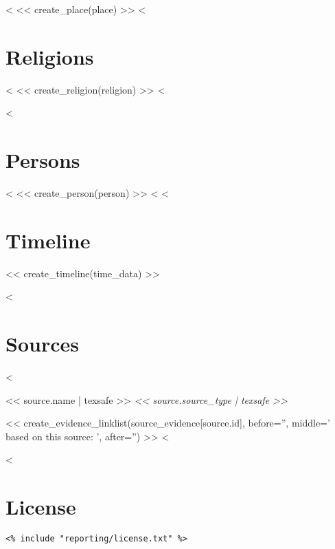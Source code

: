 \documentclass[fontsize=10pt,toc=chapterentrywithdots]{scrreprt}
\begin{document}
<%
<< create_place(place) >>
<%


\clearpage
\chapter{Religions}
\label{sec:religions}

<%
  << create_religion(religion) >>
<%


<%
\clearpage
\chapter{Persons}
\label{sec:persons}

<%
  << create_person(person) >>
<%
<%


\clearpage
\chapter{Timeline}
\label{sec:timeline}

<< create_timeline(time_data) >>


<%
\clearpage
\chapter{Sources}
\label{sec:sources}

\begin{description}
    <%
  \item[\textsc{<< source.short | texsafe >>}]
      \hypertarget{source<<source.id>>}{<< source.name | texsafe >>
        \emph{<< source.source_type | texsafe >>}}

      << create_evidence_linklist(source_evidence[source.id], before='', middle=' based on this source: ', after='') >>
    <%
\end{description}
<%


\clearpage
\chapter*{License}
\label{sec:license}

\begingroup
\small
\begin{verbatim}
<% include "reporting/license.txt" %>
\end{verbatim}
\endgroup
\end{document}
